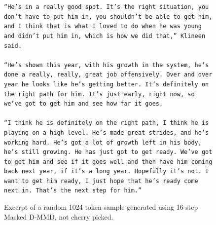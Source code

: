 \begin{figure}[]
    \centering
\begin{lstlisting}


“He’s in a really good spot. It’s the right situation, you don’t have to put him in, you shouldn’t be able to get him, and I think that is what I loved to do when he was young and didn’t put him in, which is how we did that,” Klineen said.

“He’s shown this year, with his growth in the system, he’s done a really, really, great job offensively. Over and over year he looks like he’s getting better. It’s definitely on the right path for him. It’s just early, right now, so we’ve got to get him and see how far it goes.

“I think he is definitely on the right path, I think he is playing on a high level. He’s made great strides, and he’s working hard. He’s got a lot of growth left in his body, he’s still growing. He has just got to get ready. We’ve got to get him and see if it goes well and then have him coming back next year, if it’s a long year. Hopefully it’s not. I want to get him ready, I just hope that he’s ready come next in. That’s the next step for him.”
\end{lstlisting}
    \caption{Excerpt of a random 1024-token sample generated using 16-step Masked D-MMD, not cherry picked.}
    \label{tab:placeholder}
\end{figure}
